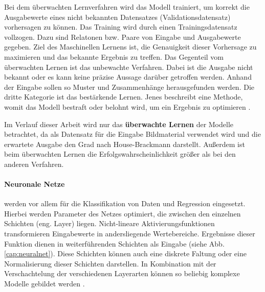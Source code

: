 Bei dem überwachten Lernverfahren wird das Modell trainiert, um korrekt die Ausgabewerte eines nicht bekannten Datensatzes (Validationsdatensatz) vorhersagen zu können. Das Training wird durch einen Trainingsdatensatz vollzogen. Dazu sind Relatonen bzw. Paare von Eingabe und Ausgabewerte gegeben. Ziel des Maschinellen Lernens ist, die Genauigkeit dieser Vorhersage zu maximieren und das bekannte Ergebnis zu treffen. Das Gegenteil vom überwachten Lernen ist das unbewachte Verfahren. Dabei ist die Ausgabe nicht bekannt oder es kann keine präzise Aussage darüber getroffen werden. Anhand der Eingabe sollen so Muster und Zusammenhänge herausgefunden werden. Die dritte Kategorie ist das bestärkende Lernen. Jenes beschreibt eine Methode, womit das Modell bestraft oder belohnt wird, um ein Ergebnis zu optimieren \cite{machinelearning_1}.

Im Verlauf dieser Arbeit wird nur das \textbf{überwachte Lernen} der Modelle betrachtet, da als Datensatz für die Eingabe Bildmaterial verwendet wird und die erwartete Ausgabe den Grad nach House-Brackmann darstellt. Außerdem ist beim überwachten Lernen die Erfolgswahrscheinlichkeit größer als bei den anderen Verfahren.


\paragraph{Neuronale Netze} werden vor allem für die Klassifikation von Daten und Regression eingesetzt. Hierbei werden Parameter des Netzes optimiert, die zwischen den einzelnen Schichten (eng. Layer) liegen. Nicht-lineare Aktivierungsfunktionen transformieren Eingabewerte in andersliegende Wertebereiche. Ergebnisse dieser Funktion dienen in weiterführenden Schichten als Eingabe (siehe Abb. \ref{cap:neuralnet}). Diese Schichten können auch eine diskrete Faltung oder eine Normalisierung dieser Schichten darstellen. In Kombination mit der Verschachtelung der verschiedenen Layerarten können so beliebig komplexe Modelle gebildet werden \cite{machinelearning_3}.


